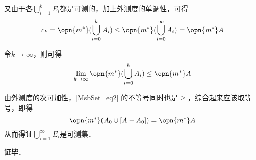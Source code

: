 又由于各$\bigcup_{i=1}^k E_i$都是可测的，加上外测度的单调性，可得
\begin{equation}
c_k=\opn{m^*}(\bigcup_{i=0}^k A_i)\leq\opn{m^*}(\bigcup_{i=0}^\infty A_i)=\opn{m^*}A
\end{equation}

令$k\to\infty$，则可得
\begin{equation}\label{MsbSet_eq2}
\lim_{k\to \infty} \opn{m^*}(\bigcup_{i=0}^k A_i)\leq \opn{m^*} A
\end{equation}

由外测度的次可加性，\autoref{MsbSet_eq2} 的不等号同时也是$\geq$，综合起来应该取等号，即得
\begin{equation}
\opn{m^*}(A_0\cup [A-A_0]) = \opn{m^*} A
\end{equation}
从而得证$\bigcup_{i=1}^\infty E_i$是可测集．




\textbf{证毕}．










